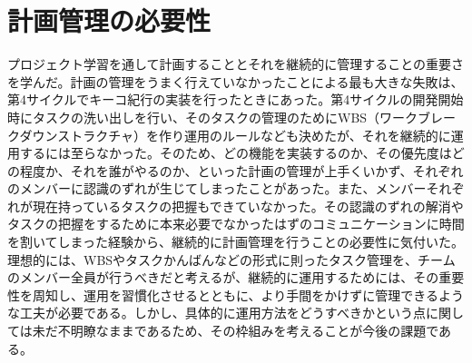 \section{計画管理の必要性}
プロジェクト学習を通して計画することとそれを継続的に管理することの重要さを学んだ。計画の管理をうまく行えていなかったことによる最も大きな失敗は、第4サイクルでキーコ紀行の実装を行ったときにあった。第4サイクルの開発開始時にタスクの洗い出しを行い、そのタスクの管理のためにWBS（ワークブレークダウンストラクチャ）を作り運用のルールなども決めたが、それを継続的に運用するには至らなかった。そのため、どの機能を実装するのか、その優先度はどの程度か、それを誰がやるのか、といった計画の管理が上手くいかず、それぞれのメンバーに認識のずれが生じてしまったことがあった。また、メンバーそれぞれが現在持っているタスクの把握もできていなかった。その認識のずれの解消やタスクの把握をするために本来必要でなかったはずのコミュニケーションに時間を割いてしまった経験から、継続的に計画管理を行うことの必要性に気付いた。理想的には、WBSやタスクかんばんなどの形式に則ったタスク管理を、チームのメンバー全員が行うべきだと考えるが、継続的に運用するためには、その重要性を周知し、運用を習慣化させるとともに、より手間をかけずに管理できるような工夫が必要である。しかし、具体的に運用方法をどうすべきかという点に関しては未だ不明瞭なままであるため、その枠組みを考えることが今後の課題である。
